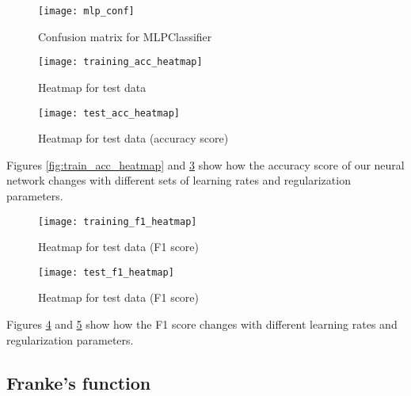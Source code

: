 \documentclass[11pt,english, A4]{article}
\begin{document}
\begin{figure}[H]
\begin{center}
  \texttt{[image: mlp\_conf]}
  \caption{Confusion matrix for MLPClassifier}
  \label{fig:mlp_conf}
  \end{center}
\end{figure}

\begin{figure}[H]
\begin{center}
  \texttt{[image: training\_acc\_heatmap]}
  \caption{Heatmap for test data}
  \label{fig:train_acc_heatmap (accuracy score)}
  \end{center}
\end{figure}

\begin{figure}[H]
\begin{center}
  \texttt{[image: test\_acc\_heatmap]}
  \caption{Heatmap for test data (accuracy score)}
  \label{fig:test_acc_heatmap}
  \end{center}
\end{figure}

Figures \ref{fig:train_acc_heatmap} and \ref{fig:test_acc_heatmap} show how the accuracy score of our neural network changes with different sets of learning rates and regularization parameters. 

\begin{figure}[H]
\begin{center}
  \texttt{[image: training\_f1\_heatmap]}
  \caption{Heatmap for test data (F1 score)}
  \label{fig:train_f1_heatmap}
  \end{center}
\end{figure}

\begin{figure}[H]
\begin{center}
  \texttt{[image: test\_f1\_heatmap]}
  \caption{Heatmap for test data (F1 score)}
  \label{fig:test_f1_heatmap}
  \end{center}
\end{figure}

Figures \ref{fig:train_f1_heatmap} and \ref{fig:test_f1_heatmap} show how the F1 score changes with different learning rates and regularization parameters.

\subsection{Franke's function}
\end{document}
